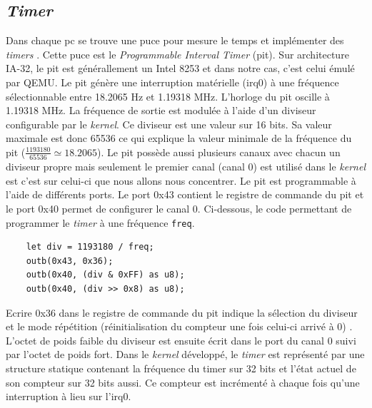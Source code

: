 
\subsection{\textit{Timer}}
Dans chaque \acrshort{pc} se trouve une puce pour mesure le temps et implémenter
des \textit{timers} \cite{ref42}. Cette puce est le \textit{Programmable Interval Timer}
(\acrshort{pit}). Sur architecture \acrshort{IA-32}, le \acrshort{pit} est générallement
un Intel 8253 et dans notre cas, c'est celui émulé par QEMU. Le \acrshort{pit}
génère une interruption matérielle (\acrshort{irq}0) à une fréquence sélectionnable
entre 18.2065 Hz et 1.19318 MHz. L'horloge du \acrshort{pit} oscille à 1.19318 MHz.
La fréquence de sortie est modulée à l'aide d'un diviseur configurable par le
\textit{kernel}. Ce diviseur est une valeur sur 16 bits. Sa valeur maximale est
donc 65536 ce qui explique la valeur minimale de la fréquence du \acrshort{pit}
($\frac{1193180}{65536} \simeq 18.2065$). Le \acrshort{pit} possède aussi plusieurs
canaux avec chacun un diviseur propre mais seulement le premier canal (canal 0)
est utilisé dans le \textit{kernel} est c'est sur celui-ci que nous allons nous
concentrer. Le \acrshort{pit} est programmable à l'aide de différents ports.
Le port 0x43 contient le registre de commande du \acrshort{pit} et le port 0x40
permet de configurer le canal 0. Ci-dessous, le code permettant de programmer
le \textit{timer} à une fréquence \texttt{freq}.

\begin{verbatim}
    let div = 1193180 / freq;
    outb(0x43, 0x36);
    outb(0x40, (div & 0xFF) as u8);
    outb(0x40, (div >> 0x8) as u8);
\end{verbatim}

Ecrire 0x36 dans le registre de commande du \acrshort{pit} indique la sélection
du diviseur et le mode répétition  (réinitialisation du compteur une fois celui-ci
arrivé à 0) \cite{ref42}. L'octet de poids faible du diviseur est ensuite écrit
dans le port du canal 0 suivi par l'octet de poids fort. Dans le \textit{kernel}
développé, le \textit{timer} est représenté par une structure statique contenant
la fréquence du timer sur 32 bits et l'état actuel de son compteur sur 32 bits aussi.
Ce compteur est incrémenté à chaque fois qu'une interruption à lieu sur l'\acrshort{irq}0.

